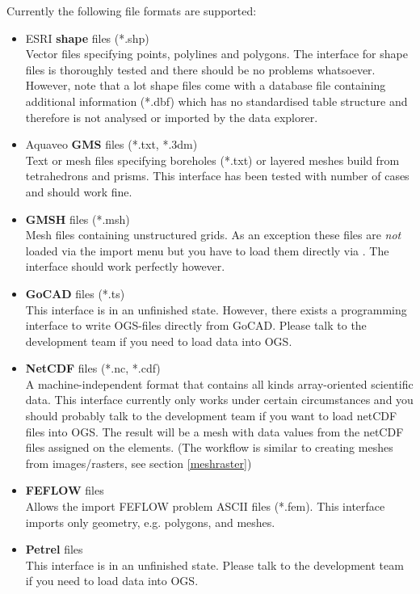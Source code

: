 Currently the following file formats are supported:
\begin{itemize}
\item ESRI \textbf{shape} files (*.shp)\\
Vector files specifying points, polylines and polygons. The interface for shape files is thoroughly tested and there should be no problems whatsoever. However, note that a lot shape files come with a database file containing additional information (*.dbf) which has no standardised table structure and therefore is not analysed or imported by the data explorer.
\item Aquaveo \textbf{GMS} files (*.txt, *.3dm)\\
Text or mesh files specifying boreholes (*.txt) or layered meshes build from tetrahedrons and prisms. This interface has been tested with number of cases and should work fine.
\item \textbf{GMSH} files (*.msh)\\
Mesh files containing unstructured grids. As an exception these files are \emph{not} loaded via the import menu but you have to load them directly via . The interface should work perfectly however.
\item \textbf{GoCAD} files (*.ts)\\
This interface is in an unfinished state. However, there exists a programming interface to write OGS-files directly from GoCAD. Please talk to the development team if you need to load data into OGS.
\item \textbf{NetCDF} files (*.nc, *.cdf)\\
A machine-independent format that contains all kinds array-oriented scientific data. This interface currently only works under certain circumstances and you should probably talk to the development team if you want to load netCDF files into OGS. The result will be a mesh with data values from the netCDF files assigned on the elements. (The workflow is similar to creating meshes from images/rasters, see section \ref{meshraster})
\item \textbf{FEFLOW} files\\
Allows the import FEFLOW problem ASCII files (*.fem). This interface imports only geometry, e.g. polygons, and meshes.
\item \textbf{Petrel} files\\
This interface is in an unfinished state. Please talk to the development team if you need to load data into OGS.

\end{itemize}
